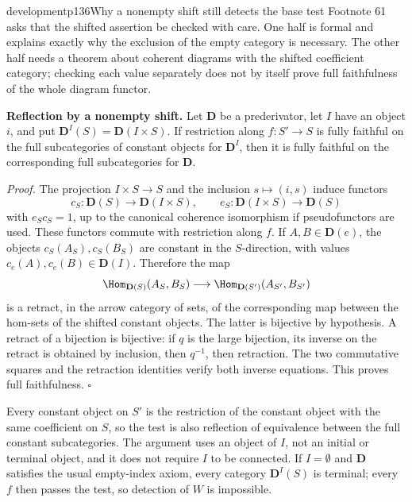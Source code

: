\begin{dcomment}{development}{p136}{Why a nonempty shift still detects the base test}
Footnote 61 asks that the shifted assertion be checked with care. One half is formal and explains exactly why the exclusion of the empty category is necessary. The other half needs a theorem about coherent diagrams with the shifted coefficient category; checking each value separately does not by itself prove full faithfulness of the whole diagram functor.

\textbf{Reflection by a nonempty shift.}\ours
Let $\mathbf D$ be a prederivator, let $I$ have an object $i$, and put $\mathbf D^I(S)=\mathbf D(I\times S)$. If restriction along $f:S'\longrightarrow S$ is fully faithful on the full subcategories of constant objects for $\mathbf D^I$, then it is fully faithful on the corresponding full subcategories for $\mathbf D$.

\emph{Proof.} The projection $I\times S\longrightarrow S$ and the inclusion $s\mapsto(i,s)$ induce functors
\[
 c_S:\mathbf D(S)\longrightarrow\mathbf D(I\times S),
 \qquad e_S:\mathbf D(I\times S)\longrightarrow\mathbf D(S)
\]
with $e_Sc_S=1$, up to the canonical coherence isomorphism if pseudofunctors are used. These functors commute with restriction along $f$. If $A,B\in\mathbf D(e)$, the objects $c_S(A_S),c_S(B_S)$ are constant in the $S$-direction, with values $c_e(A),c_e(B)\in\mathbf D(I)$. Therefore the map
\[
 \Hom_{\mathbf D(S)}(A_S,B_S)
 \longrightarrow\Hom_{\mathbf D(S')}(A_{S'},B_{S'})
\]
is a retract, in the arrow category of sets, of the corresponding map between the hom-sets of the shifted constant objects. The latter is bijective by hypothesis. A retract of a bijection is bijective: if $q$ is the large bijection, its inverse on the retract is obtained by inclusion, then $q^{-1}$, then retraction. The two commutative squares and the retraction identities verify both inverse equations. This proves full faithfulness. \hfill$\square$

Every constant object on $S'$ is the restriction of the constant object with the same coefficient on $S$, so the test is also reflection of equivalence between the full constant subcategories. The argument uses an object of $I$, not an initial or terminal object, and it does not require $I$ to be connected. If $I=\emptyset$ and $\mathbf D$ satisfies the usual empty-index axiom, every category $\mathbf D^I(S)$ is terminal; every $f$ then passes the test, so detection of $W$ is impossible.


\end{dcomment}

